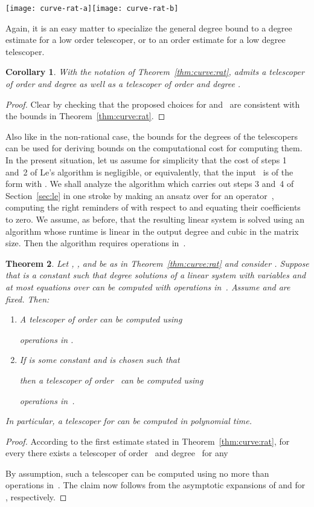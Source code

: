 \documentclass{sig-alternate}
\newtheorem{theorem}{Theorem}
\newtheorem{corollary}[theorem]{Corollary}
\begin{document}
\centerline{\texttt{[image: curve-rat-a]}\hfil\texttt{[image: curve-rat-b]}}

\smallskip

Again, it is an easy matter to specialize the general degree bound to a degree estimate
for a low order telescoper, or to an order estimate for a low degree telescoper.

\begin{corollary}
  With the notation of Theorem~\ref{thm:curve:rat},  admits a telescoper of
  order  and degree 
  as well as a telescoper of order  and degree .
\end{corollary}
\begin{proof}
  Clear by checking that the proposed choices for  and~ are consistent with
  the bounds in Theorem~\ref{thm:curve:rat}.
\end{proof}

Also like in the non-rational case, the bounds for the degrees of the telescopers can be used for
deriving bounds on the computational cost for computing them. In the present situation,
let us assume for simplicity that the cost of steps 1 and~2 of Le's algorithm is negligible,
or equivalently, that the input~ is of the form  with .
We shall analyze the algorithm which carries out steps 3 and~4 of Section~\ref{sec:le} in one
stroke by making an ansatz over  for an operator~, computing
the right reminders of  with respect to  and equating their coefficients to
zero. We assume, as before, that the resulting linear system is solved using an
algorithm whose runtime is linear in the output degree and cubic in the matrix size. Then
the algorithm requires  operations in~.

\begin{theorem}\label{thm:rat:compl}
  Let , , and  be as in Theorem~\ref{thm:curve:rat}
  and consider .
  Suppose that  is a constant such that degree  solutions of a linear system
  with  variables and at most  equations over  can be computed with  operations
  in~. Assume  and  are fixed.
  Then:
  \begin{enumerate}
  \item A telescoper of order  can be computed using
  
  operations in .
  \item\label{it:rat:2} If  is some constant and  is chosen such that
  
  then a telescoper of order~ can be computed using
  
  operations in~.
  \end{enumerate}
  In particular, a telescoper for  can be computed in polynomial time.
\end{theorem}
\begin{proof}
  According to the first estimate stated in Theorem~\ref{thm:curve:rat}, for every 
  there exists a telescoper of order~ and degree~ for any
  
  By assumption, such a telescoper can be computed using no more than 
  operations in~. The claim now follows from the asymptotic expansions of 
  and  for , respectively.
\end{proof}
\end{document}
